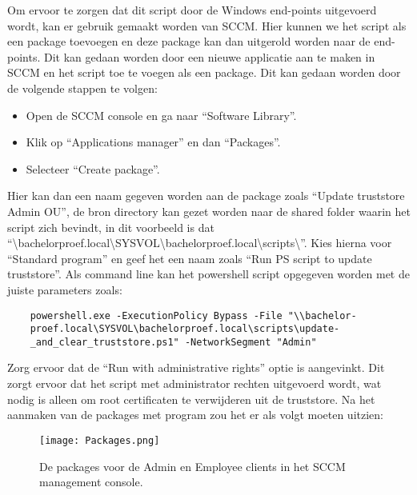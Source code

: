 Om ervoor te zorgen dat dit script door de Windows end-points uitgevoerd wordt, kan er gebruik gemaakt worden van SCCM. Hier kunnen we het script als een package toevoegen en deze package kan dan uitgerold worden naar de end-points. Dit kan gedaan worden door een nieuwe applicatie aan te maken in SCCM en het script toe te voegen als een package.
Dit kan gedaan worden door de volgende stappen te volgen:
\begin{itemize}
    \item Open de SCCM console en ga naar ``Software Library''.
    \item Klik op ``Applications manager'' en dan ``Packages''.
    \item Selecteer ``Create package''.
\end{itemize}

Hier kan dan een naam gegeven worden aan de package zoals ``Update truststore Admin OU'', de bron directory kan gezet worden naar de shared folder waarin het script zich bevindt, in dit voorbeeld is dat \\
 ``\textbackslash bachelorproef.local\textbackslash SYSVOL\textbackslash bachelorproef.local\textbackslash scripts\textbackslash''.
Kies hierna voor ``Standard program'' en geef het een naam zoals ``Run PS script to update truststore''. Als command line kan het powershell script opgegeven worden met de juiste parameters zoals:
\begin{verbatim}
    powershell.exe -ExecutionPolicy Bypass -File "\\bachelor-
    proef.local\SYSVOL\bachelorproef.local\scripts\update-
    _and_clear_truststore.ps1" -NetworkSegment "Admin"
\end{verbatim}

\pagebreak

Zorg ervoor dat de ``Run with administrative rights'' optie is aangevinkt. Dit zorgt ervoor dat het script met administrator rechten uitgevoerd wordt, wat nodig is alleen om root certificaten te verwijderen uit de truststore.
Na het aanmaken van de packages met program zou het er als volgt moeten uitzien: \\

\begin{figure}[H]
  \centering
  \texttt{[image: Packages.png]}
  \caption[Packages in het SCCM management console]{\label{fig:Packages} De packages voor de Admin en Employee clients in het SCCM management console.}
\end{figure}

